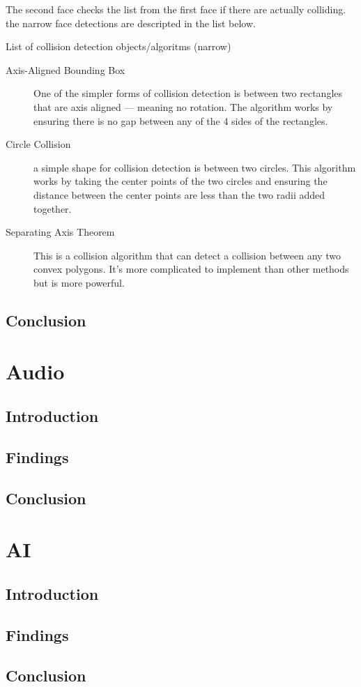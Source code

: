\documentclass{projdoc}
\begin{document}

The second face checks the list from the first face if there are actually colliding. the narrow face detections are descripted in the list below.

List of collision detection objects/algoritms (narrow)
\begin{description}
	\item[Axis-Aligned Bounding Box]One of the simpler forms of collision detection is between two rectangles that are axis aligned — meaning no rotation. The algorithm works by ensuring there is no gap between any of the 4 sides of the rectangles.
	\item[Circle Collision] a simple shape for collision detection is between two circles. This algorithm works by taking the center points of the two circles and ensuring the distance between the center points are less than the two radii added together.
	\item[Separating Axis Theorem] This is a collision algorithm that can detect a collision between any two convex polygons. It's more complicated to implement than other methods but is more powerful.
\end{description}


\subsection{Conclusion}


\section{Audio}

\subsection{Introduction}

\subsection{Findings}

\subsection{Conclusion}

\section{AI}

\subsection{Introduction}

\subsection{Findings}

\subsection{Conclusion}
\end{document}

